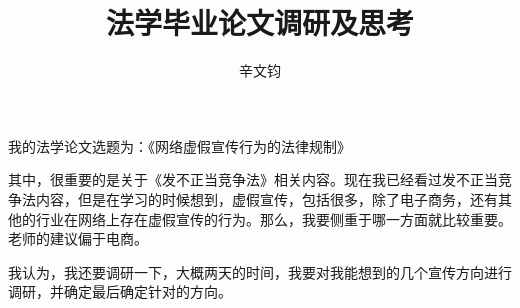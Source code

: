 \documentclass[a4paper]{article}
\title{法学毕业论文调研及思考}
\author{辛文钧}
\begin{document}
	\maketitle
	我的法学论文选题为：《网络虚假宣传行为的法律规制》
	
	其中，很重要的是关于《发不正当竞争法》相关内容。现在我已经看过发不正当竞争法内容，但是在学习的时候想到，虚假宣传，包括很多，除了电子商务，还有其他的行业在网络上存在虚假宣传的行为。那么，我要侧重于哪一方面就比较重要。老师的建议偏于电商。
	
	我认为，我还要调研一下，大概两天的时间，我要对我能想到的几个宣传方向进行调研，并确定最后确定针对的方向。
\end{document}

